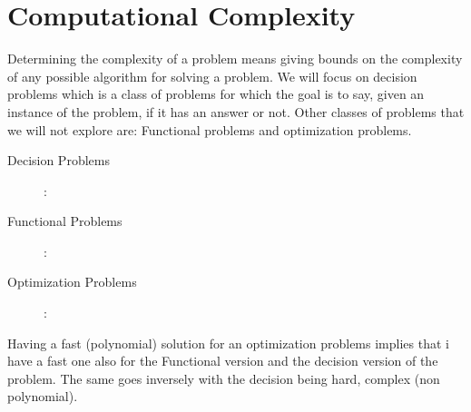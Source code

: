 \section{Computational Complexity}
Determining the complexity of a problem means giving bounds on the complexity of any possible algorithm for solving a problem.
We will focus on decision problems which is a class of problems for which the goal is to say, given an instance of the problem, if it has an answer or not. Other classes of problems that we will not explore are: Functional problems and optimization problems.\\
\begin{description}
    \item[Decision Problems] : 
    \item[Functional Problems] : 
    \item[Optimization Problems] :
\end{description}
Having a fast (polynomial) solution for an optimization problems implies that i have a fast one also for the Functional version and the decision version of the problem. The same goes inversely with the decision being hard, complex (non polynomial).\\
